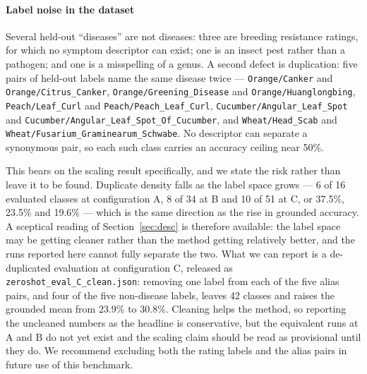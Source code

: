 \documentclass[a4paper,fleqn]{cas-dc}
\begin{document}
\paragraph{Label noise in the dataset} Several held-out ``diseases'' are not diseases: three are
breeding resistance ratings, for which no symptom descriptor can exist; one is an insect pest rather
than a pathogen; and one is a misspelling of a genus. A second defect is duplication: five pairs of
held-out labels name the same disease twice --- \texttt{Orange/Canker} and
\texttt{Orange/Citrus\_Canker}, \texttt{Orange/Greening\_Disease} and
\texttt{Orange/Huanglongbing}, \texttt{Peach/Leaf\_Curl} and \texttt{Peach/Peach\_Leaf\_Curl},
\texttt{Cucumber/Angular\_Leaf\_Spot} and \texttt{Cucumber/Angular\_Leaf\_Spot\_Of\_Cucumber}, and
\texttt{Wheat/Head\_Scab} and \texttt{Wheat/Fusarium\_Graminearum\_Schwabe}. No descriptor can
separate a synonymous pair, so each such class carries an accuracy ceiling near 50\%.

This bears on the scaling result specifically, and we state the risk rather than leave it to be
found. Duplicate density falls as the label space grows --- 6 of 16 evaluated classes at
configuration A, 8 of 34 at B and 10 of 51 at C, or 37.5\%, 23.5\% and 19.6\% --- which is the
same direction as the rise in grounded accuracy. A sceptical reading of Section~\ref{sec:desc} is
therefore available: the label space may be getting cleaner rather than the method getting
relatively better, and the runs reported here cannot fully separate the two. What we can report is a
de-duplicated evaluation at configuration C, released as \texttt{zeroshot\_eval\_C\_clean.json}:
removing one label from each of the five alias pairs, and four of the five non-disease
labels, leaves 42 classes and raises the grounded mean
from 23.9\% to 30.8\%. Cleaning helps the method, so reporting the uncleaned numbers as the
headline is conservative, but the equivalent runs at A and B do not yet exist and the scaling claim
should be read as provisional until they do. We recommend excluding both the rating labels and the
alias pairs in future use of this benchmark.
\end{document}
